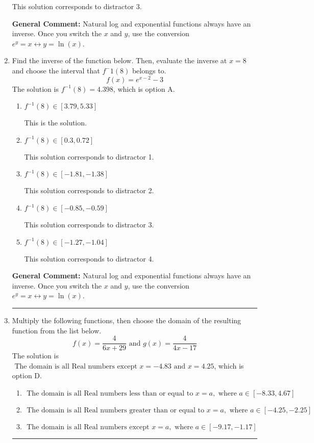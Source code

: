 \documentclass{extbook}[14pt]
\newcommand{\litem}[1]{\item #1

\rule{\textwidth}{0.4pt}}
\begin{document}
\begin{enumerate}
{\begin{enumerate}[label=\Alph*.]
 This solution corresponds to distractor 3.
\end{enumerate}

\textbf{General Comment:} Natural log and exponential functions always have an inverse. Once you switch the $x$ and $y$, use the conversion $ e^y = x \leftrightarrow y=\ln(x)$.
}
\litem{
Find the inverse of the function below. Then, evaluate the inverse at $x = 8$ and choose the interval that $f^-1(8)$ belongs to.
\[ f(x) = e^{x-2}-3 \]The solution is \( f^{-1}(8) = 4.398 \), which is option A.\begin{enumerate}[label=\Alph*.]
\item \( f^{-1}(8) \in [3.79, 5.33] \)

 This is the solution.
\item \( f^{-1}(8) \in [0.3, 0.72] \)

 This solution corresponds to distractor 1.
\item \( f^{-1}(8) \in [-1.81, -1.38] \)

 This solution corresponds to distractor 2.
\item \( f^{-1}(8) \in [-0.85, -0.59] \)

 This solution corresponds to distractor 3.
\item \( f^{-1}(8) \in [-1.27, -1.04] \)

 This solution corresponds to distractor 4.
\end{enumerate}

\textbf{General Comment:} Natural log and exponential functions always have an inverse. Once you switch the $x$ and $y$, use the conversion $ e^y = x \leftrightarrow y=\ln(x)$.
}
\litem{
Multiply the following functions, then choose the domain of the resulting function from the list below.
\[ f(x) = \frac{4}{6x+29} \text{ and } g(x) = \frac{4}{4x-17} \]The solution is \( \text{ The domain is all Real numbers except } x = -4.83 \text{ and } x = 4.25 \), which is option D.\begin{enumerate}[label=\Alph*.]
\item \( \text{ The domain is all Real numbers less than or equal to } x = a, \text{ where } a \in [-8.33, 4.67] \)


\item \( \text{ The domain is all Real numbers greater than or equal to } x = a, \text{ where } a \in [-4.25, -2.25] \)


\item \( \text{ The domain is all Real numbers except } x = a, \text{ where } a \in [-9.17, -1.17] \)



\end{enumerate}}
\end{enumerate}
\end{document}
